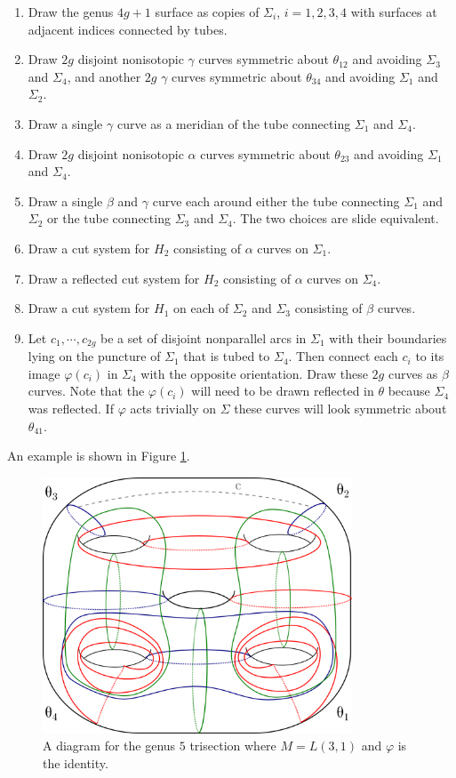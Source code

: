 \documentclass[12pt]{amsart}
\theoremstyle{definition}
\theoremstyle{remark}
\begin{document}
\begin{enumerate}
\item Draw the genus $4g+1$ surface as copies of $\Sigma_i$, $i = 1,2,3,4$ with surfaces at adjacent indices connected by tubes.
\item Draw $2g$ disjoint nonisotopic $\gamma$ curves symmetric about $\theta_{12}$ and avoiding $\Sigma_3$ and $\Sigma_4$, and another $2g$ $\gamma$ curves symmetric about $\theta_{34}$ and avoiding $\Sigma_1$ and $\Sigma_2$.
\item Draw a single $\gamma$ curve as a meridian of the tube connecting $\Sigma_1$ and $\Sigma_4$.
\item Draw $2g$ disjoint nonisotopic $\alpha$ curves symmetric about $\theta_{23}$ and avoiding $\Sigma_1$ and $\Sigma_4$.
\item Draw a single $\beta$ and $\gamma$ curve each around either the tube connecting $\Sigma_1$ and $\Sigma_2$ or the tube connecting $\Sigma_3$ and $\Sigma_4$.
The two choices are slide equivalent.
\item Draw a cut system for $H_2$ consisting of $\alpha$ curves on $\Sigma_1$.
\item Draw a reflected cut system for $H_2$ consisting of $\alpha$ curves on $\Sigma_4$.
\item Draw a cut system for $H_1$ on each of $\Sigma_2$ and $\Sigma_3$ consisting of $\beta$ curves.
\item Let $c_1,\cdots,c_{2g}$ be a set of disjoint nonparallel arcs in $\Sigma_1$ with their boundaries lying on the puncture of $\Sigma_1$ that is tubed to $\Sigma_4$.
Then connect each $c_i$ to its image $\varphi(c_i)$ in $\Sigma_4$ with the opposite orientation.
Draw these $2g$ curves as $\beta$ curves.
Note that the $\varphi(c_i)$ will need to be drawn reflected in $\theta$ because $\Sigma_4$ was reflected.
If $\varphi$ acts trivially on $\Sigma$ these curves will look symmetric about $\theta_{41}$.
\end{enumerate}

An example is shown in Figure \ref{unbalancedex}.



\begin{figure}[h]
\centering
\includegraphics[height=3in]{LxS12.png}
\caption{A diagram for the genus $5$ trisection where $M = L(3,1)$ and $\varphi$ is the identity.
}
\label{unbalancedex}
\end{figure}
\end{document}
